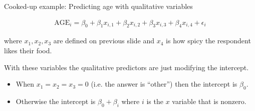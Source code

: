 \documentclass[aspectratio=169]{beamer}
\begin{document}
\begin{frame}{Cooked-up example:  Predicting age with qualitative variables}

\begin{align*}
\text{AGE}_i = \beta_0 + \beta_1 x_{i,1} + \beta_2 x_{i,2} + \beta_3 x_{i,3} + \beta_4 x_{i,4} + \epsilon_i
\end{align*}

where $x_{1}, x_2, x_3$ are defined on previous slide and $x_4$ is how spicy the respondent likes their food.

\vspace{5mm}

With these variables the qualitative predictors are just modifying the intercept.  
\begin{itemize}
\item When $x_1=x_2=x_3=0$ (i.e. the answer is ``other'') then the intercept is $\beta_0$.
\item Otherwise the intercept is $\beta_0+\beta_i$ where $i$ is the $x$ variable that is nonzero.
\end{itemize}

\end{frame}
\end{document}
